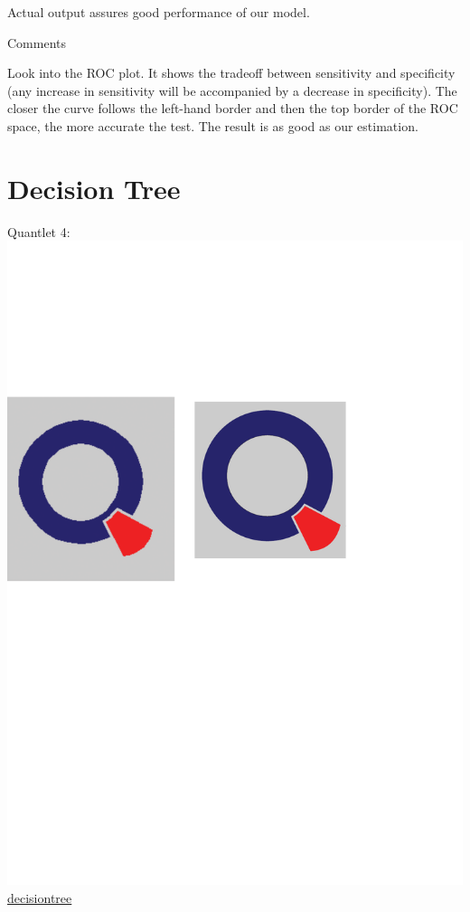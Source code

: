 \documentclass[12pt, a4paper, bibliography=totoc, english]{scrartcl}
\begin{document}
Actual output assures good performance of our model.

\textbullet\quad Comments


Look into the ROC plot. It shows the tradeoff between sensitivity and specificity (any increase in sensitivity will be accompanied by a decrease in specificity). The closer the curve follows the left-hand border and then the top border of the ROC space, the more accurate the test. The result is as good as our estimation.


\section{Decision Tree}
Quantlet 4:\includegraphics[scale=0.08]{qletlogo}
\textcolor{blue}{\href{https://github.com/JingyiLiu3136/MLFBM/tree/master/decisiontree}{decisiontree}}\\
\end{document}

